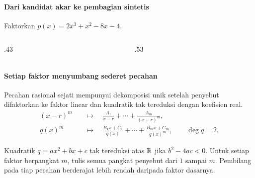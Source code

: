 \documentclass{../../kalkulus-ppt}
\begin{document}
\begin{frame}{\insertsection}
    \framesubtitle{Dari kandidat akar ke pembagian sintetis}
    \begin{contoh}
        Faktorkan $p(x)=2x^3+x^2-8x-4$.
    \end{contoh}
    \begin{columns}[c,onlytextwidth]
        \begin{column}{.43\textwidth}
        \end{column}
        \begin{column}{.53\textwidth}
        \end{column}
    \end{columns}
\end{frame}

\begin{frame}{\insertsection}
    \framesubtitle{Setiap faktor menyumbang sederet pecahan}
    \begin{teorema}
        Pecahan rasional sejati mempunyai dekomposisi unik setelah penyebut
        difaktorkan ke faktor linear dan kuadratik tak tereduksi dengan koefisien real.
        \[
            \begin{aligned}
                (x-r)^m &\quad\longmapsto\quad
                    \frac{A_1}{x-r}+\cdots+\frac{A_m}{(x-r)^m},\\
                q(x)^m &\quad\longmapsto\quad
                    \frac{B_1x+C_1}{q(x)}+\cdots+\frac{B_mx+C_m}{q(x)^m},
                    \qquad \deg q=2.
            \end{aligned}
        \]
    \end{teorema}
    Kuadratik $q=ax^2+bx+c$ tak tereduksi atas $\mathbb{R}$ jika $b^2-4ac<0$.
    Untuk setiap faktor berpangkat $m$, tulis semua pangkat penyebut dari $1$ sampai $m$.
    Pembilang pada tiap pecahan berderajat lebih rendah daripada faktor dasarnya.
\end{frame}
\end{document}
